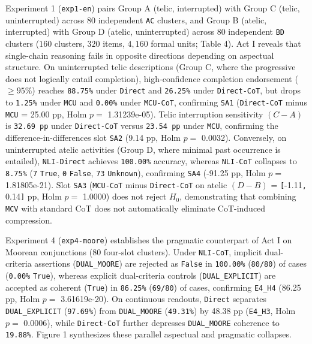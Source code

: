 \documentclass[11pt,a4paper]{article}
\begin{document}
Experiment 1 (\texttt{exp1-\allowbreak{}en}) pairs Group A (telic, interrupted) with Group C (telic, uninterrupted) across $80$ independent \texttt{AC} clusters, and Group B (atelic, interrupted) with Group D (atelic, uninterrupted) across $80$ independent \texttt{BD} clusters ($160$ clusters, $320$ items, $4{,}160$ formal units; Table 4). Act I reveals that single-chain reasoning fails in opposite directions depending on aspectual structure. On uninterrupted telic descriptions (Group C, where the progressive does not logically entail completion), high-confidence completion endorsement ($\ge 95\%$) reaches \texttt{88.75\%} under \texttt{Direct} and \texttt{26.25\%} under \texttt{Direct-\allowbreak{}CoT}, but drops to \texttt{1.25\%} under \texttt{MCU} and \texttt{0.00\%} under \texttt{MCU-\allowbreak{}CoT}, confirming \texttt{SA1} (\texttt{Direct-\allowbreak{}CoT} minus \texttt{MCU} = 25.00 pp, Holm $p=$ 1.31239e-05). Telic interruption sensitivity $(C-A)$ is \texttt{32.69 pp} under \texttt{Direct-\allowbreak{}CoT} versus \texttt{23.54 pp} under \texttt{MCU}, confirming the difference-in-differences slot \texttt{SA2} (9.14 pp, Holm $p=$ 0.0032). Conversely, on uninterrupted atelic activities (Group D, where minimal past occurrence is entailed), \texttt{NLI-\allowbreak{}Direct} achieves \texttt{100.00\%} accuracy, whereas \texttt{NLI-\allowbreak{}CoT} collapses to \texttt{8.75\%} (\texttt{7} \texttt{True}, \texttt{0} \texttt{False}, \texttt{73} \texttt{Unknown}), confirming \texttt{SA4} (-91.25 pp, Holm $p=$ 1.81805e-21). Slot \texttt{SA3} (\texttt{MCU-\allowbreak{}CoT} minus \texttt{Direct-\allowbreak{}CoT} on atelic $(D-B)$ = \texttt{[}-1.11\texttt{, }0.14\texttt{]} pp, Holm $p=$ 1.0000) does not reject $H_0$, demonstrating that combining \texttt{MCV} with standard CoT does not automatically eliminate CoT-induced compression.

Experiment 4 (\texttt{exp4-\allowbreak{}moore}) establishes the pragmatic counterpart of Act I on Moorean conjunctions ($80$ four-slot clusters). Under \texttt{NLI-\allowbreak{}CoT}, implicit dual-criteria assertions (\texttt{DUAL\_\allowbreak{}MOORE}) are rejected as \texttt{False} in \texttt{100.00\%} (\texttt{80/\allowbreak{}80}) of cases (\texttt{0.00\%} \texttt{True}), whereas explicit dual-criteria controls (\texttt{DUAL\_\allowbreak{}EXPLICIT}) are accepted as coherent (\texttt{True}) in \texttt{86.25\%} (\texttt{69/\allowbreak{}80}) of cases, confirming \texttt{E4\_\allowbreak{}H4} (86.25 pp, Holm $p=$ 3.61619e-20). On continuous readouts, \texttt{Direct} separates \texttt{DUAL\_\allowbreak{}EXPLICIT} (\texttt{97.69\%}) from \texttt{DUAL\_\allowbreak{}MOORE} (\texttt{49.31\%}) by 48.38 pp (\texttt{E4\_\allowbreak{}H3}, Holm $p=$ 0.0006), while \texttt{Direct-\allowbreak{}CoT} further depresses \texttt{DUAL\_\allowbreak{}MOORE} coherence to \texttt{19.88\%}. Figure 1 synthesizes these parallel aspectual and pragmatic collapses.
\end{document}
